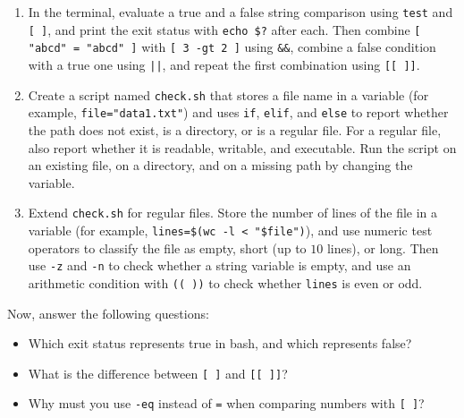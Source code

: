 \begin{enumerate}
    \item In the terminal, evaluate a true and a false string comparison using \texttt{test} and \texttt{[ ]}, and print the exit status with \texttt{echo \$?} after each. Then combine \texttt{[ "abcd" = "abcd" ]} with \texttt{[ 3 -gt 2 ]} using \texttt{\&\&}, combine a false condition with a true one using \texttt{||}, and repeat the first combination using \texttt{[[ ]]}.
    \item Create a script named \texttt{check.sh} that stores a file name in a variable (for example, \texttt{file="data1.txt"}) and uses \texttt{if}, \texttt{elif}, and \texttt{else} to report whether the path does not exist, is a directory, or is a regular file. For a regular file, also report whether it is readable, writable, and executable. Run the script on an existing file, on a directory, and on a missing path by changing the variable.
    \item Extend \texttt{check.sh} for regular files. Store the number of lines of the file in a variable (for example, \texttt{lines=\$(wc -l < "\$file")}), and use numeric test operators to classify the file as empty, short (up to $10$ lines), or long. Then use \texttt{-z} and \texttt{-n} to check whether a string variable is empty, and use an arithmetic condition with \texttt{(( ))} to check whether \texttt{lines} is even or odd.
\end{enumerate}

Now, answer the following questions:
\begin{itemize}
    \item Which exit status represents true in bash, and which represents false?
    \item What is the difference between \texttt{[ ]} and \texttt{[[ ]]}?
    \item Why must you use \texttt{-eq} instead of \texttt{=} when comparing numbers with \texttt{[ ]}?
\end{itemize}